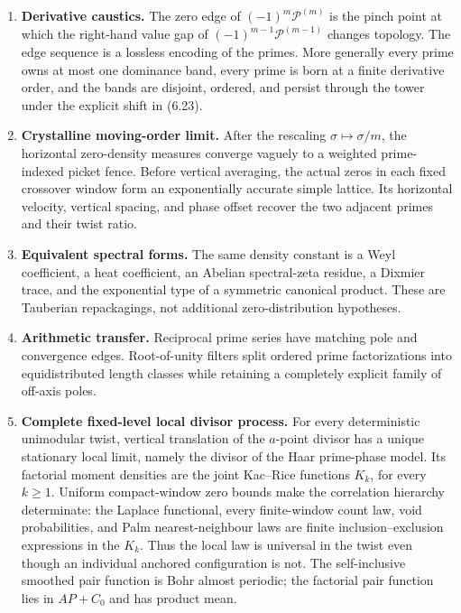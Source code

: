 \documentclass[11pt]{article}
\theoremstyle{definition}
\theoremstyle{remark}
\newcommand{\cP}{\mathcal P}
\begin{document}
\begin{enumerate}[label=\textup{(\Roman*)},leftmargin=2.4em]
\item \textbf{Derivative caustics.}
The zero edge of $(-1)^m\cP^{(m)}$ is the pinch point at which the right-hand value gap
of $(-1)^{m-1}\cP^{(m-1)}$ changes topology.  The edge sequence is a lossless encoding
of the primes.  More generally every prime owns at most one dominance band, every prime
is born at a finite derivative order, and the bands are disjoint, ordered, and persist
through the tower under the explicit shift in (6.23).

\item \textbf{Crystalline moving-order limit.}
After the rescaling $\sigma\mapsto\sigma/m$, the horizontal zero-density measures
converge vaguely to a weighted prime-indexed picket fence.  Before vertical averaging,
the actual zeros in each fixed crossover window form an exponentially accurate simple
lattice.  Its horizontal velocity, vertical spacing, and phase offset recover the two
adjacent primes and their twist ratio.

\item \textbf{Equivalent spectral forms.}
The same density constant is a Weyl coefficient, a heat coefficient, an Abelian
spectral-zeta residue, a Dixmier trace, and the exponential type of a symmetric
canonical product.  These are Tauberian repackagings, not additional zero-distribution
hypotheses.

\item \textbf{Arithmetic transfer.}
Reciprocal prime series have matching pole and convergence edges.  Root-of-unity
filters split ordered prime factorizations into equidistributed length classes while
retaining a completely explicit family of off-axis poles.
\item \textbf{Complete fixed-level local divisor process.}
For every deterministic unimodular twist, vertical translation of the
$a$-point divisor has a unique stationary local limit, namely the divisor of the
Haar prime-phase model.  Its factorial moment densities are the joint Kac--Rice
functions $K_k$, for every $k\geq1$.  Uniform compact-window zero bounds make
the correlation hierarchy determinate: the Laplace functional, every
finite-window count law, void probabilities, and Palm nearest-neighbour laws
are finite inclusion--exclusion expressions in the $K_k$.  Thus the local law
is universal in the twist even though an individual anchored configuration is
not.  The self-inclusive smoothed pair function is Bohr almost periodic; the
factorial pair function lies in $AP+C_0$ and has product mean.


\end{enumerate}
\end{document}

